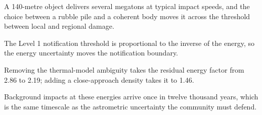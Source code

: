 \begin{keytakeaways}
\item A 140-metre object delivers several megatons at typical impact
speeds, and the choice between a rubble pile and a coherent body moves it
across the threshold between local and regional damage.
\item The Level 1 notification threshold is proportional to the inverse of
the energy, so the energy uncertainty moves the notification boundary.
\item Removing the thermal-model ambiguity takes the residual energy factor
from 2.86 to 2.19; adding a close-approach density takes it to 1.46.
\item Background impacts at these energies arrive once in twelve thousand
years, which is the same timescale as the astrometric uncertainty the
community must defend.
\end{keytakeaways}
